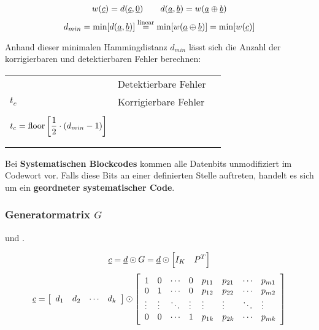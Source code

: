 \documentclass[a4paper]{article}
\begin{document}
\begin{twocolumn}
$$w(\underline{c}) = d(\underline{c}, \underline{0}) \qquad d(\underline{a}, \underline{b}) = w(\underline{a} \oplus \underline{b})$$
$$d_{min} = \min [ d(\underline{a}, \underline{b})] \stackrel{\text{linear}}{=} \min [ w(\underline{a} \oplus \underline{b})] = \min [w(\underline{c})]$$

Anhand dieser minimalen Hammingdistanz $d_{min}$ lässt sich die Anzahl der korrigierbaren und detektierbaren Fehler berechnen:

\begin{tabular}{lll}
  \begin{dtabular}
    $t_d$ & Detektierbare Fehler \\
    $t_c$ & Korrigierbare Fehler \\
  \end{dtabular} &
  \begin{mtabular}{l}
    $t_d = d_{min} - 1$ \\
    $\displaystyle t_c= \operatorname{floor} \left[ \frac{1}{2} \cdot (d_{min} - 1) \right]$ \\
  \end{mtabular} &
  \begin{mtabular}{l}
    $\fmm 2^{n-k}\geq \sum_{i=0}^{t_c} \binom{n}{i}$ \\
  \end{mtabular}
\end{tabular}

Bei \textbf{Systematischen Blockcodes} kommen alle Datenbits unmodifiziert im Codewort vor. 
Falls diese Bits an einer definierten Stelle auftreten, handelt es sich um ein \textbf{geordneter systematischer Code}.

\subsubsection{Generatormatrix $G$}
 und .

$$\underline{c} = \underline{d} \odot G = \underline{d} \odot \left[ I_K \quad P^T \right]$$
$$\underline{c} = \left[ \begin{array}{llll} d_1 & d_2 & \cdots & d_k \end{array} \right] \odot 
  \left[ \begin{array}{llllllll} 
    1 & 0 & \cdots & 0 & p_{11} & p_{21} & \cdots & p_{m1} \\
    0 & 1 & \cdots & 0 & p_{12} & p_{22} & \cdots & p_{m2} \\
    \vdots & \vdots & \ddots & \vdots & \vdots & \vdots & \ddots & \vdots \\
    0 & 0 & \cdots & 1 & p_{1k} & p_{2k} & \cdots & p_{mk} \\
  \end{array} \right]
$$


\end{twocolumn}
\end{document}

